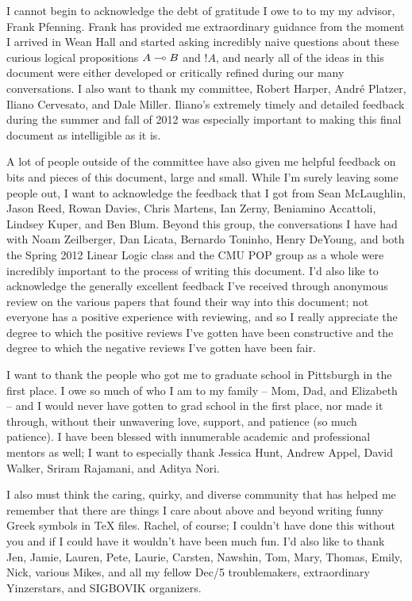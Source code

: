 \documentclass[12pt]{cmuthesis}
\begin{document}
\begin{acknowledgments}
  I cannot begin to acknowledge the debt of gratitude I owe to to my
  my advisor, Frank Pfenning. Frank has provided me extraordinary
  guidance from the moment I arrived in Wean Hall and started asking
  incredibly naive questions about these curious logical propositions
  $A \multimap B$ and ${!}A$, and nearly all of the ideas in this
  document were either developed or critically refined during our many
  conversations. I also want to thank my committee, Robert Harper,
  Andr{\'e} Platzer, Iliano Cervesato, and Dale Miller. Iliano's
  extremely timely and detailed feedback during the summer and fall of
  2012 was especially important to making this final document as
  intelligible as it is.

  A lot of people outside of the committee have also given me helpful
  feedback on bits and pieces of this document, large and small. While
  I'm surely leaving some people out, I want to acknowledge the
  feedback that I got from Sean McLaughlin, Jason Reed, Rowan Davies,
  Chris Martens, Ian Zerny, Beniamino Accattoli, Lindsey Kuper, and
  Ben Blum. Beyond this group, the conversations I have had with Noam
  Zeilberger, Dan Licata, Bernardo Toninho, Henry DeYoung, and both
  the Spring 2012 Linear Logic class and the CMU POP group as a whole
  were incredibly important to the process of writing this document.
  I'd also like to acknowledge the generally excellent feedback I've
  received through anonymous review on the various papers that found
  their way into this document; not everyone has a positive experience
  with reviewing, and so I really appreciate the degree to which the
  positive reviews I've gotten have been constructive and the degree
  to which the negative reviews I've gotten have been fair.

  I want to thank the people who got me to graduate school in
  Pittsburgh in the first place. I owe so much of who I am to my
  family -- Mom, Dad, and Elizabeth -- and I would never have gotten
  to grad school in the first place, nor made it through, without
  their unwavering love, support, and patience (so much patience). I
  have been blessed with innumerable academic and professional mentors
  as well; I want to especially thank Jessica Hunt, Andrew Appel,
  David Walker, Sriram Rajamani, and Aditya Nori.

  I also must think the caring, quirky, and diverse community that has
  helped me remember that there are things I care about above and beyond
  writing funny Greek symbols in TeX files.  Rachel, of course; I
  couldn't have done this without you and if I could have it wouldn't
  have been much fun. I'd also like to thank Jen, Jamie, Lauren, Pete,
  Laurie, Carsten, Nawshin, Tom, Mary, Thomas, Emily, Nick, various Mikes,
  and all my fellow Dec/5 troublemakers, extraordinary Yinzerstars,
  and SIGBOVIK organizers.


\end{acknowledgments}
\end{document}
